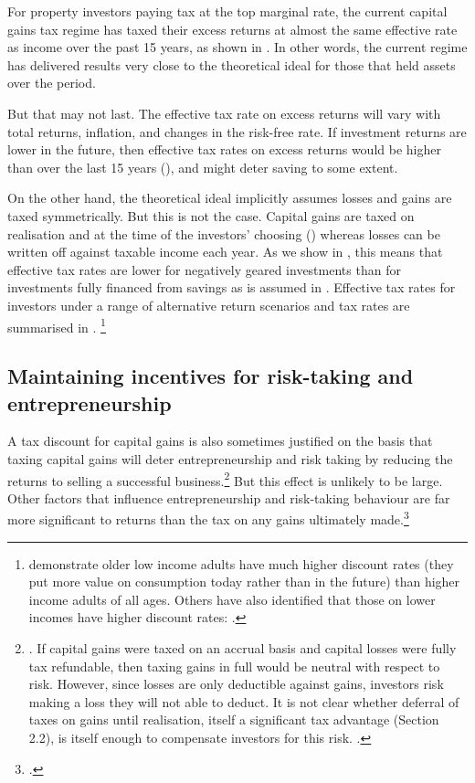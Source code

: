 For property investors paying tax at the top marginal rate, the current capital gains tax regime has taxed their excess returns at almost the same effective rate as income over the past 15 years, as shown in . In other words, the current regime has delivered results very close to the theoretical ideal for those that held assets over the period. 

But that may not last. The effective tax rate on excess returns will vary with total returns, inflation, and changes in the risk-free rate. If investment returns are lower in the future, then effective tax rates on excess returns would be higher than over the last 15 years (), and might deter saving to some extent. 

On the other hand, the theoretical ideal implicitly assumes losses and gains are taxed symmetrically. But this is not the case. Capital gains are taxed on realisation and at the time of the investors’ choosing () whereas losses can be written off against taxable income each year. As we show in , this means that effective tax rates are lower for negatively geared investments than for investments fully financed from savings as is assumed in . Effective tax rates for investors under a range of alternative return scenarios and tax rates are summarised in .%
\footnote{\textcite{GreenMyersonLichtmanEtAl1996} demonstrate older low income adults have much higher discount rates (\ie they put more value on consumption today rather than in the future) than higher income adults of all ages. Others have also identified that those on lower incomes have higher discount rates:  \textcites{ReimersMaylorStewartEtAl2009}{HarrisonLauWilliams2002}.}

\subsection{Maintaining incentives for risk-taking and entrepreneurship}\label{subsubsec:maintain-incentives-for-risk-taking}
A tax discount for capital gains is also sometimes justified on the basis that taxing capital gains will deter entrepreneurship and risk taking by reducing the returns to selling a successful business.\footnote{\textcite[][8--11]{ClemensLammamLo2014}. If capital gains were taxed on an accrual basis and capital losses were fully tax refundable, then taxing gains in full would be neutral with respect to risk. However, since losses are only deductible against gains, investors risk making a loss they will not able to deduct. It is not clear whether deferral of taxes on gains until realisation, itself a significant tax advantage (Section 2.2), is itself enough to compensate investors for this risk. \textcites[8]{Burman2009}[130]{ProductivityCommission2004FirstHomeOwnership}.} 
But this effect is unlikely to be large. Other factors that influence entrepreneurship and risk-taking behaviour are far more significant to returns than the tax on any gains ultimately made.\footcite[][75]{Burman1999} 

